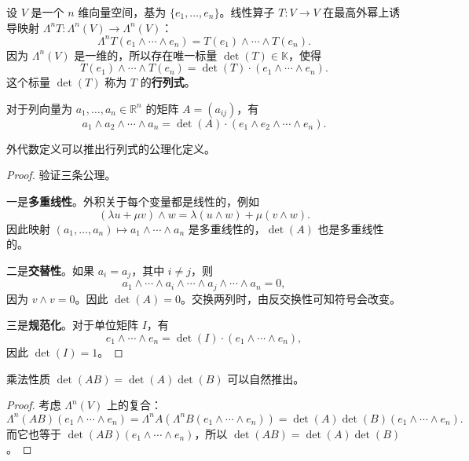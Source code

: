 \begin{definition}[通过外代数定义行列式]
设 $V$ 是一个 $n$ 维向量空间，基为 $\{e_1,\ldots,e_n\}$。线性算子 $T:V\to V$ 在最高外幂上诱导映射 $\Lambda^nT:\Lambda^n(V)\to\Lambda^n(V)$：
\[
\Lambda^nT(e_1\wedge\cdots\wedge e_n)=T(e_1)\wedge\cdots\wedge T(e_n).
\]
因为 $\Lambda^n(V)$ 是一维的，所以存在唯一标量 $\det(T)\in\mathbb{K}$，使得
\[
T(e_1)\wedge\cdots\wedge T(e_n)=\det(T)\cdot(e_1\wedge\cdots\wedge e_n).
\]
这个标量 $\det(T)$ 称为 $T$ 的\textbf{行列式}。

对于列向量为 $a_1,\ldots,a_n\in\mathbb{R}^n$ 的矩阵 $A=(a_{ij})$，有
\[
a_1\wedge a_2\wedge\cdots\wedge a_n=\det(A)\cdot(e_1\wedge e_2\wedge\cdots\wedge e_n).
\]
\end{definition}

\begin{theorem}
外代数定义可以推出行列式的公理化定义。
\end{theorem}

\begin{proof}
验证三条公理。

一是\textbf{多重线性}。外积关于每个变量都是线性的，例如
\[
(\lambda u+\mu v)\wedge w=\lambda(u\wedge w)+\mu(v\wedge w).
\]
因此映射 $(a_1,\ldots,a_n)\mapsto a_1\wedge\cdots\wedge a_n$ 是多重线性的，$\det(A)$ 也是多重线性的。

二是\textbf{交替性}。如果 $a_i=a_j$，其中 $i\neq j$，则
\[
a_1\wedge\cdots\wedge a_i\wedge\cdots\wedge a_j\wedge\cdots\wedge a_n=0,
\]
因为 $v\wedge v=0$。因此 $\det(A)=0$。交换两列时，由反交换性可知符号会改变。

三是\textbf{规范化}。对于单位矩阵 $I$，有
\[
e_1\wedge\cdots\wedge e_n=\det(I)\cdot(e_1\wedge\cdots\wedge e_n),
\]
因此 $\det(I)=1$。
\end{proof}

\begin{corollary}
乘法性质 $\det(AB)=\det(A)\det(B)$ 可以自然推出。
\end{corollary}

\begin{proof}
考虑 $\Lambda^n(V)$ 上的复合：
\[
\Lambda^n(AB)(e_1\wedge\cdots\wedge e_n)
=\Lambda^nA(\Lambda^nB(e_1\wedge\cdots\wedge e_n))
=\det(A)\det(B)(e_1\wedge\cdots\wedge e_n).
\]
而它也等于 $\det(AB)(e_1\wedge\cdots\wedge e_n)$，所以 $\det(AB)=\det(A)\det(B)$。
\end{proof}


